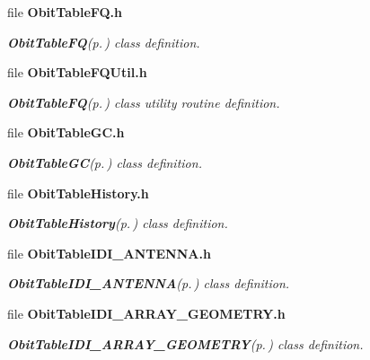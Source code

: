 \begin{CompactItemize}
\item 
file {\bf Obit\-Table\-FQ.h}
\begin{CompactList}\small\item\em {\bf Obit\-Table\-FQ}{\rm (p.\,\pageref{structObitTableFQ})} class definition. \item\end{CompactList}

\item 
file {\bf Obit\-Table\-FQUtil.h}
\begin{CompactList}\small\item\em {\bf Obit\-Table\-FQ}{\rm (p.\,\pageref{structObitTableFQ})} class utility routine definition. \item\end{CompactList}

\item 
file {\bf Obit\-Table\-GC.h}
\begin{CompactList}\small\item\em {\bf Obit\-Table\-GC}{\rm (p.\,\pageref{structObitTableGC})} class definition. \item\end{CompactList}

\item 
file {\bf Obit\-Table\-History.h}
\begin{CompactList}\small\item\em {\bf Obit\-Table\-History}{\rm (p.\,\pageref{structObitTableHistory})} class definition. \item\end{CompactList}

\item 
file {\bf Obit\-Table\-IDI\_\-ANTENNA.h}
\begin{CompactList}\small\item\em {\bf Obit\-Table\-IDI\_\-ANTENNA}{\rm (p.\,\pageref{structObitTableIDI__ANTENNA})} class definition. \item\end{CompactList}

\item 
file {\bf Obit\-Table\-IDI\_\-ARRAY\_\-GEOMETRY.h}
\begin{CompactList}\small\item\em {\bf Obit\-Table\-IDI\_\-ARRAY\_\-GEOMETRY}{\rm (p.\,\pageref{structObitTableIDI__ARRAY__GEOMETRY})} class definition. \item\end{CompactList}


\end{CompactItemize}
